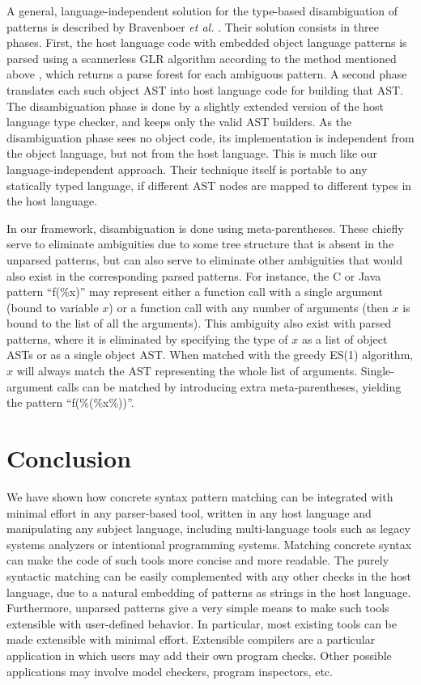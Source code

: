 \documentclass{sigplanconf}
\begin{document}
A general, language-independent solution for the type-based
disambiguation of patterns is described by Bravenboer {\em et al.}
\cite{type-disambig}. Their solution consists in three phases. First,
the host language code with embedded object language patterns is
parsed using a scannerless GLR algorithm according to the method
mentioned above \cite{metaprog}, which returns a parse forest for each
ambiguous pattern. A second phase translates each such object AST into
host language code for building that AST. The disambiguation phase is
done by a slightly extended version of the host language type checker,
and keeps only the valid AST builders. As the disambiguation phase
sees no object code, its implementation is independent from the object
language, but not from the host language. This is much like our
language-independent approach. Their technique itself is portable to
any statically typed language, if different AST nodes are mapped to
different types in the host language.

In our framework, disambiguation is done using meta-parentheses. These
chiefly serve to eliminate ambiguities due to some tree structure that
is absent in the unparsed patterns, but can also serve to eliminate
other ambiguities that would also exist in the corresponding parsed
patterns.  For instance, the C or Java pattern ``f(\%x)'' may
represent either a function call with a single argument (bound to
variable $x$) or a function call with any number of arguments (then
$x$ is bound to the list of all the arguments). This ambiguity also
exist with parsed patterns, where it is eliminated by specifying the
type of $x$ as a list of object ASTs or as a single object AST. When
matched with the greedy ES(1) algorithm, $x$ will always match the AST
representing the whole list of arguments.  Single-argument calls can
be matched by introducing extra meta-parentheses, yielding the pattern
``f(\%(\%x\%))''.

\section{Conclusion}
\label{concl}
We have shown how concrete syntax pattern matching can be integrated
with minimal effort in any parser-based tool, written in any host
language and manipulating any subject language, including
multi-language tools such as legacy systems analyzers or intentional
programming systems. Matching concrete syntax can make the code of
such tools more concise and more readable.  The purely syntactic
matching can be easily complemented with any other checks in the host
language, due to a natural embedding of patterns as strings in the
host language.  Furthermore, unparsed patterns give a very simple
means to make such tools extensible with user-defined behavior. In
particular, most existing tools can be made extensible with minimal
effort. Extensible compilers are a particular application in which
users may add their own program checks. Other possible applications may
involve model checkers, program inspectors, etc.
\end{document}
